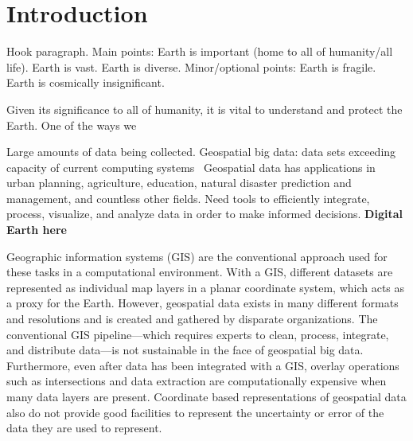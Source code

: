 \chapter{Introduction}

Hook paragraph. Main points:
Earth is important (home to all of humanity/all life).
Earth is vast.
Earth is diverse.
Minor/optional points:
Earth is fragile.
Earth is cosmically insignificant.


Given its significance to all of humanity, it is vital to understand and protect the Earth.
One of the ways we 



Large amounts of data being collected. Geospatial big data: data sets exceeding capacity of current computing systems~\cite{lee2015geospatial} Geospatial data has applications in urban planning, agriculture, education, natural disaster prediction and management, and countless other fields. Need tools to efficiently integrate, process, visualize, and analyze data in order to make informed decisions. \textbf{Digital Earth here}


Geographic information systems (GIS) are the conventional approach used for these tasks in a computational environment.
With a GIS, different datasets are represented as individual map layers in a planar coordinate system, which acts as a proxy for the Earth.
However, geospatial data exists in many different formats and resolutions and is created and gathered by disparate organizations.
The conventional GIS pipeline---which requires experts to clean, process, integrate, and distribute data---is not sustainable in the face of geospatial big data.
Furthermore, even after data has been integrated with a GIS, overlay operations such as intersections and data extraction are computationally expensive when many data layers are present.
Coordinate based representations of geospatial data also do not provide good facilities to represent the uncertainty or error of the data they are used to represent.


